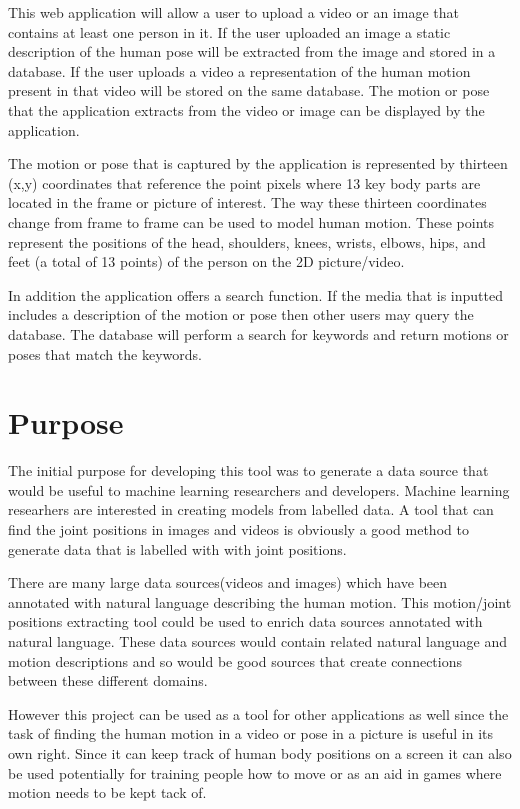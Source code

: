 \documentclass{scrreprt}
\begin{document}
  This web application will allow a user to upload a video or an image that contains at least one person in it. If the user uploaded an image a static description of the human pose will be extracted from the image and stored in a database.  If the user uploads a video a representation of the human motion present in that video will be stored on the same database.  The motion or pose that the application extracts from the video or image can be displayed by the application.
  
  The motion or pose that is captured by the application is represented by thirteen (x,y) coordinates that reference the point pixels where 13 key body parts are located in the frame or picture of interest.  The way these thirteen coordinates change from frame to frame can be used to model human motion.  These points represent the positions of the head, shoulders, knees, wrists, elbows, hips, and feet (a total of 13 points) of the person on the 2D picture/video.

	In addition the application offers a search function.  If the media that is inputted includes a description of the motion or pose then other users may query the database.  The database will perform a search for keywords and return motions or poses that match the keywords.

\section{Purpose}
The initial purpose for developing this tool was to generate a data source that would be useful to machine learning researchers and developers.  Machine learning researhers are interested in creating models from labelled data.  A tool that can find the joint positions in images and videos is obviously a good method to generate data that is labelled with with joint positions.  

There are many large data sources(videos and images) which have been annotated with natural language describing the human motion. This motion/joint positions extracting tool could be used to enrich data sources annotated with natural language.  These data sources would contain related natural language  and motion descriptions and so would be good sources that create connections between these different domains.
 
However this project can be used as a tool for other applications as well since the task of finding the human motion in a video or pose in a picture is useful in its own right.  
Since it can keep track of human body positions on a screen it can also be used potentially for training people how to move or as an aid in games where motion needs to be kept tack of.
\end{document}
